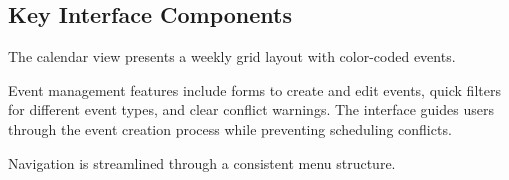 \subsection{Key Interface Components}\label{subsec:interface-components}

The calendar view presents a weekly grid layout with color-coded events.

Event management features include forms to create and edit events, quick filters for different event types, and clear conflict warnings.
The interface guides users through the event creation process while preventing scheduling conflicts.

Navigation is streamlined through a consistent menu structure.
